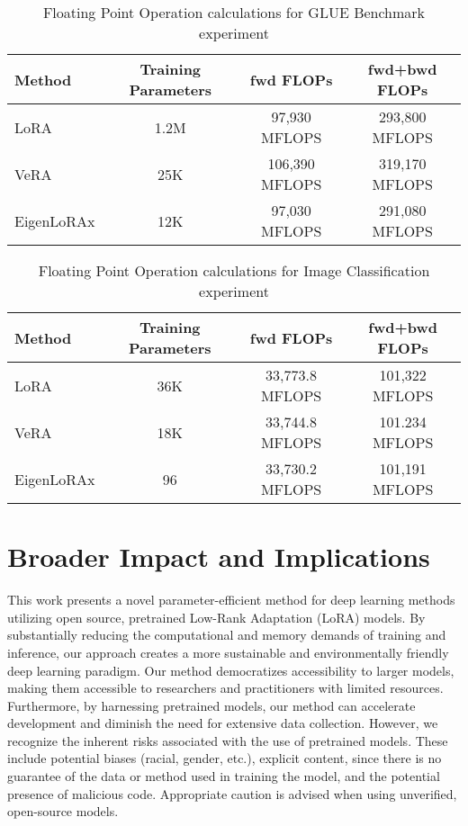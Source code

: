 \begin{table}[!htb]
    \centering
        \caption{Floating Point Operation calculations for GLUE Benchmark experiment}
    \begin{tabular}{lccc}
    \toprule
        Method & Training Parameters & fwd FLOPs & fwd+bwd FLOPs \\ 
        \midrule
        LoRA & 1.2M & 97,930 MFLOPS & 293,800 MFLOPS \\ 
        VeRA & 25K & 106,390 MFLOPS & 319,170 MFLOPS \\ 
        EigenLoRAx & 12K & 97,030 MFLOPS & 291,080 MFLOPS \\ 
        \bottomrule
    \end{tabular}
    \label{tab:flop_glue}
\end{table}

\begin{table}[!htb]
    \centering
        \caption{Floating Point Operation calculations for Image Classification experiment}
    \begin{tabular}{lccc}
    \toprule
        Method & Training Parameters & fwd FLOPs & fwd+bwd FLOPs \\ 
        \midrule
        LoRA & 36K & 33,773.8 MFLOPS & 101,322 MFLOPS \\ 
        VeRA & 18K & 33,744.8 MFLOPS & 101.234 MFLOPS \\ 
        EigenLoRAx & 96 & 33,730.2 MFLOPS & 101,191 MFLOPS \\ 
        \bottomrule
    \end{tabular}
    \label{tab:flop_class}
\end{table}

\FloatBarrier
\section{Broader Impact and Implications}\label{sec:impact}
This work presents a novel parameter-efficient method for deep learning methods utilizing open source, pretrained Low-Rank Adaptation (LoRA) models. By substantially reducing the computational and memory demands of training and inference, our approach creates a more sustainable and environmentally friendly deep learning paradigm. Our method democratizes accessibility to larger models, making them accessible to researchers and practitioners with limited resources. Furthermore, by harnessing pretrained models, our method can accelerate development and diminish the need for extensive data collection. However, we recognize the inherent risks associated with the use of pretrained models. These include potential biases (racial, gender, etc.), explicit content, since there is no guarantee of the data or method used in training the model, and the potential presence of malicious code. Appropriate caution is advised when using unverified, open-source models.